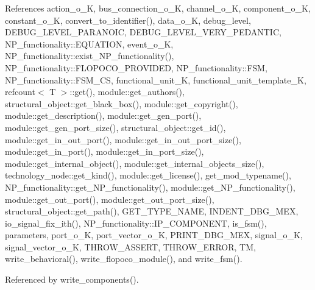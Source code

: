 References action\+\_\+o\+\_\+K, bus\+\_\+connection\+\_\+o\+\_\+K, channel\+\_\+o\+\_\+K, component\+\_\+o\+\_\+K, constant\+\_\+o\+\_\+K, convert\+\_\+to\+\_\+identifier(), data\+\_\+o\+\_\+K, debug\+\_\+level, D\+E\+B\+U\+G\+\_\+\+L\+E\+V\+E\+L\+\_\+\+P\+A\+R\+A\+N\+O\+IC, D\+E\+B\+U\+G\+\_\+\+L\+E\+V\+E\+L\+\_\+\+V\+E\+R\+Y\+\_\+\+P\+E\+D\+A\+N\+T\+IC, N\+P\+\_\+functionality\+::\+E\+Q\+U\+A\+T\+I\+ON, event\+\_\+o\+\_\+K, N\+P\+\_\+functionality\+::exist\+\_\+\+N\+P\+\_\+functionality(), N\+P\+\_\+functionality\+::\+F\+L\+O\+P\+O\+C\+O\+\_\+\+P\+R\+O\+V\+I\+D\+ED, N\+P\+\_\+functionality\+::\+F\+SM, N\+P\+\_\+functionality\+::\+F\+S\+M\+\_\+\+CS, functional\+\_\+unit\+\_\+K, functional\+\_\+unit\+\_\+template\+\_\+K, refcount$<$ T $>$\+::get(), module\+::get\+\_\+authors(), structural\+\_\+object\+::get\+\_\+black\+\_\+box(), module\+::get\+\_\+copyright(), module\+::get\+\_\+description(), module\+::get\+\_\+gen\+\_\+port(), module\+::get\+\_\+gen\+\_\+port\+\_\+size(), structural\+\_\+object\+::get\+\_\+id(), module\+::get\+\_\+in\+\_\+out\+\_\+port(), module\+::get\+\_\+in\+\_\+out\+\_\+port\+\_\+size(), module\+::get\+\_\+in\+\_\+port(), module\+::get\+\_\+in\+\_\+port\+\_\+size(), module\+::get\+\_\+internal\+\_\+object(), module\+::get\+\_\+internal\+\_\+objects\+\_\+size(), technology\+\_\+node\+::get\+\_\+kind(), module\+::get\+\_\+license(), get\+\_\+mod\+\_\+typename(), N\+P\+\_\+functionality\+::get\+\_\+\+N\+P\+\_\+functionality(), module\+::get\+\_\+\+N\+P\+\_\+functionality(), module\+::get\+\_\+out\+\_\+port(), module\+::get\+\_\+out\+\_\+port\+\_\+size(), structural\+\_\+object\+::get\+\_\+path(), G\+E\+T\+\_\+\+T\+Y\+P\+E\+\_\+\+N\+A\+ME, I\+N\+D\+E\+N\+T\+\_\+\+D\+B\+G\+\_\+\+M\+EX, io\+\_\+signal\+\_\+fix\+\_\+ith(), N\+P\+\_\+functionality\+::\+I\+P\+\_\+\+C\+O\+M\+P\+O\+N\+E\+NT, is\+\_\+fsm(), parameters, port\+\_\+o\+\_\+K, port\+\_\+vector\+\_\+o\+\_\+K, P\+R\+I\+N\+T\+\_\+\+D\+B\+G\+\_\+\+M\+EX, signal\+\_\+o\+\_\+K, signal\+\_\+vector\+\_\+o\+\_\+K, T\+H\+R\+O\+W\+\_\+\+A\+S\+S\+E\+RT, T\+H\+R\+O\+W\+\_\+\+E\+R\+R\+OR, TM, write\+\_\+behavioral(), write\+\_\+flopoco\+\_\+module(), and write\+\_\+fsm().



Referenced by write\+\_\+components().

